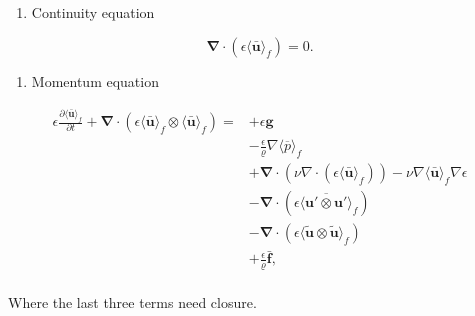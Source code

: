 \documentclass[a4paper,11pt]{article}
\begin{document}
\begin{enumerate}
\def\labelenumi{\arabic{enumi}.}
\item
  Continuity equation
\end{enumerate}

$$\bm\nabla\cdot\left(\epsilon\langle\bm{\bar u}\rangle_f\right) = 0.$$

\begin{enumerate}
\def\labelenumi{\arabic{enumi}.}
\setcounter{enumi}{1}
\item
  Momentum equation
\end{enumerate}

\begin{align*}
    \epsilon\frac{\partial\langle\bm{\bar u}\rangle_f}{\partial t} + \bm\nabla\cdot\left(\epsilon\langle\bm{\bar u}\rangle_f\otimes\langle\bm{\bar u}\rangle_f\right) =&+ \epsilon\bm g\\
        &- \frac{\epsilon}{\varrho}\nabla\langle\overline p\rangle_f\\
        &+ \bm\nabla\cdot\left(\nu\nabla\cdot\left(\epsilon\langle\bm{\bar u}\rangle_f\right)\right) -\nu\nabla\langle\bm{\bar u}\rangle_f\nabla\epsilon\\
        &- \bm\nabla\cdot\left(\epsilon\langle \overline{\bm u'\otimes\bm u'}\rangle_f\right)\\
        &- \bm\nabla\cdot\left(\epsilon\langle \tilde{\bm u}\otimes\tilde{\bm u}\rangle_f\right)\\
        &+ \frac{\epsilon}{\varrho}\bm{\bar f},\\
\end{align*}

Where the last three terms need closure.

\clearpage


\label{sec:bibliographie}
\thispagestyle{empty}
\end{document}
